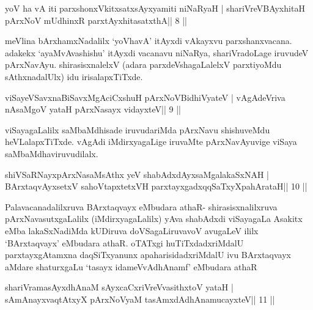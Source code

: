 
\begin{shl}
yoV ha vA iti parxshonxVkitxsatxsAyxyamiti niNaRyaH |
shariVreV\s BAyxhitaH pArxNoV mUdhinxR parxtAyxhitasatxthA\hfill || 8 ||
\end{shl}

\begin{artha}
meVlina bArxhamxNadalilx `yoVhavA' itAyxdi vAkayxvu parxshanxvacana.
adakekx `ayaMvAvashishu' itAyxdi vacanavu niNaRya, shariVradoLage
iruvudeV pArxNavAyu. shirasisxnalelxV (adara parxdeVshagaLalelxV
parxtiyoMdu sAthxnadalUlx) idu irisalapxTiTxde.
\end{artha}

\begin{shl}
viSayeVSavxnaBiSavxMgAciCxshuH  pArxNoV\s BidhiVyateV |
vAgAdeVriva nA\s\s saMgoV yataH pArxNasayx vidayxteV\hfill || 9 ||
\end{shl}

\begin{artha}
viSayagaLalilx saMbaMdhisade iruvudariMda pArxNavu shishuveMdu heVLalapxTiTxde. vAgAdi iMdirxyagaLige iruvaMte pArxNavAyuvige viSaya saMbaMdhaviruvudilalx.
\end{artha}

\begin{shl}
shiVSaRNayxpArxNasaMsAthx yeV shabAdxdAyxsaMgalakaSxNAH |
BArxtaqvAyxsetxV sahoVtapxtetxVH parxtayxgadxqqSaTxyXpahArataH\hfill || 10 ||
\end{shl}

\begin{artha}
Palavacanadalilxruva BArxtaqvayx eMbudara athaR- shirasisxnalilxruva
pArxNavasutxgaLalilx (iMdirxyagaLalilx) yAva shabAdxdi viSayagaLa
Asakitx eMba lakaSxNadiMda kUDiruva doVSagaLiruvavoV avugaLeV ililx
`BArxtaqvayx' eMbudara athaR. oTATxgi huTiTxdadxriMdalU
parxtayxgAtamxna daqSiTxyanunx apaharisidadxriMdalU ivu BArxtaqvayx
aMdare shaturxgaLu `tasayx idameVvA\s\s dhAnamf' eMbudara athaR
\end{artha}

\begin{shl}
shariVramasAyx\s\s dhAnaM sAyxcaCxriVreV\s vasithxtoV yataH |
sAmAnayxvaqtAtxyX pArxNoV\s yaM tasAmxdAdhAnamucayxteV\hfill || 11 ||
\end{shl}

